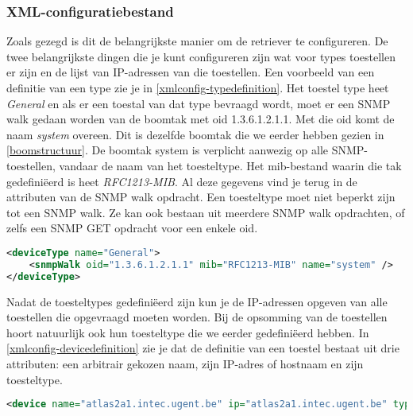 
\subsubsection{XML-configuratiebestand}
Zoals gezegd is dit de belangrijkste manier om de retriever te configureren.
De twee belangrijkste dingen die je kunt configureren zijn wat voor types toestellen er zijn en de lijst van IP-adressen van die toestellen.
Een voorbeeld van een definitie van een type zie je in \lstlistingnamesentence \ref{xmlconfig-typedefinition}.
Het toestel type heet \emph{General} en als er een toestal van dat type bevraagd wordt,
moet er een SNMP walk gedaan worden van de boomtak met \gls{oid} 1.3.6.1.2.1.1. Met die \gls{oid} komt de naam \emph{system} overeen.
Dit is dezelfde boomtak die we eerder hebben gezien in \figurenamesentence \ref{boomstructuur}.
De boomtak system is verplicht aanwezig op alle SNMP-toestellen, vandaar de naam van het toesteltype.
Het \gls{mib}-bestand waarin die tak gedefiniëerd is heet \emph{RFC1213-MIB}. Al deze gegevens vind je terug in de attributen van de SNMP walk opdracht.
Een toesteltype moet niet beperkt zijn tot een SNMP walk. Ze kan ook bestaan uit meerdere SNMP walk opdrachten,
of zelfs een SNMP GET opdracht voor een enkele \gls{oid}.

\begin{lstlisting}[language=XML, float=h, caption={Definitie van een toesteltype in het XML-configuratiebestand}, label=xmlconfig-typedefinition]
<deviceType name="General">
	<snmpWalk oid="1.3.6.1.2.1.1" mib="RFC1213-MIB" name="system" />
</deviceType>
\end{lstlisting}

Nadat de toesteltypes gedefiniëerd zijn kun je de IP-adressen opgeven van alle toestellen die opgevraagd moeten worden.
Bij de opsomming van de toestellen hoort natuurlijk ook hun toesteltype die we eerder gedefiniëerd hebben.
In \lstlistingnamesentence \ref{xmlconfig-devicedefinition} zie je dat de definitie van een toestel bestaat uit drie attributen: een arbitrair gekozen naam, zijn IP-adres of hostnaam en zijn toesteltype. 

\begin{lstlisting}[language=XML, float=h, caption={Definitie van een toestel in het XML-configuratiebestand}, label=xmlconfig-devicedefinition]
<device name="atlas2a1.intec.ugent.be" ip="atlas2a1.intec.ugent.be" type="Bridge" />
\end{lstlisting}

